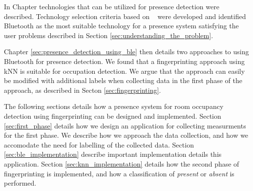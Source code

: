 In Chapter \label{sec:presence_intro} technologies that can be utilized for presence detection were described. 
Technology selection criteria based on \citeauthor{presence_ble_review}~\cite{presence_ble_review} were developed and identified Bluetooth as the most suitable technology for a presence system satisfying the user problems described in Section \ref{sec:understanding_the_problem}.

Chapter \ref{sec:presence_detection_using_ble} then details two approaches to using Bluetooth for presence detection. We found that a fingerprinting approach using kNN is suitable for occupation detection. 
We argue that the approach can easily be modified with additional labels when collecting data in the first phase of the approach, as described in Secton \ref{sec:fingerprinting}.

The following sections details how a presence system for room occupancy detection using fingerprinting can be designed and implemented. 
Section \ref{sec:first_phase} details how we design an application for collecting measurments for the first phase. 
We describe how we approach the data collection, and how  we accomodate the need for labelling of the collected data.
Section \ref{sec:ble_implementation} describe important implementation details this application. 
Section \ref{sec:knn_implementation} details how the second phase of fingerprinting is implemented, and how a classification of \textit{present} or \textit{absent} is performed.



